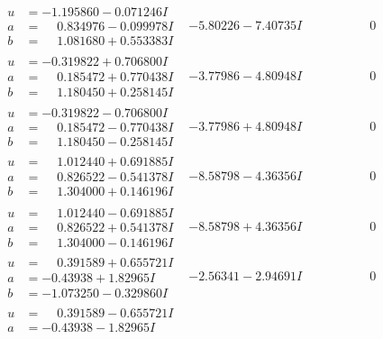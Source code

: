 \documentclass[1p]{elsarticle_modified}
\theoremstyle{definition}
\begin{document}
$$\begin{array}{c|c|c}
 \hline 
\begin{aligned}
u &= -1.195860 - 0.071246 I \\
a &= \phantom{-}0.834976 - 0.099978 I \\
b &= \phantom{-}1.081680 + 0.553383 I\end{aligned}
 & -5.80226 - 7.40735 I & \phantom{-0.000000 } 0 \\ \hline\begin{aligned}
u &= -0.319822 + 0.706800 I \\
a &= \phantom{-}0.185472 + 0.770438 I \\
b &= \phantom{-}1.180450 + 0.258145 I\end{aligned}
 & -3.77986 - 4.80948 I & \phantom{-0.000000 } 0 \\ \hline\begin{aligned}
u &= -0.319822 - 0.706800 I \\
a &= \phantom{-}0.185472 - 0.770438 I \\
b &= \phantom{-}1.180450 - 0.258145 I\end{aligned}
 & -3.77986 + 4.80948 I & \phantom{-0.000000 } 0 \\ \hline\begin{aligned}
u &= \phantom{-}1.012440 + 0.691885 I \\
a &= \phantom{-}0.826522 - 0.541378 I \\
b &= \phantom{-}1.304000 + 0.146196 I\end{aligned}
 & -8.58798 - 4.36356 I & \phantom{-0.000000 } 0 \\ \hline\begin{aligned}
u &= \phantom{-}1.012440 - 0.691885 I \\
a &= \phantom{-}0.826522 + 0.541378 I \\
b &= \phantom{-}1.304000 - 0.146196 I\end{aligned}
 & -8.58798 + 4.36356 I & \phantom{-0.000000 } 0 \\ \hline\begin{aligned}
u &= \phantom{-}0.391589 + 0.655721 I \\
a &= -0.43938 + 1.82965 I \\
b &= -1.073250 - 0.329860 I\end{aligned}
 & -2.56341 - 2.94691 I & \phantom{-0.000000 } 0 \\ \hline\begin{aligned}
u &= \phantom{-}0.391589 - 0.655721 I \\
a &= -0.43938 - 1.82965 I \\

\end{aligned}
\end{array}$$
\end{document}

